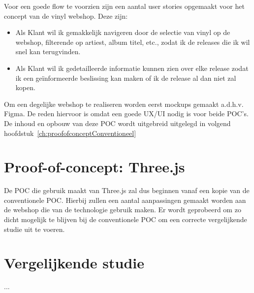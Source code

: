 Voor een goede flow te voorzien zijn een aantal user stories opgemaakt voor het concept van de vinyl webshop. Deze zijn:

\begin{itemize}
	\item Als Klant wil ik gemakkelijk navigeren door de selectie van vinyl op de webshop, filterende op artiest, album titel, etc., zodat ik de releases die ik wil snel kan terugvinden.
	\item Als Klant wil ik gedetailleerde informatie kunnen zien over elke release zodat ik een geïnformeerde beslissing kan maken of ik de release al dan niet zal kopen.
\end{itemize}

Om een degelijke webshop te realiseren worden eerst mockups gemaakt a.d.h.v. Figma. De reden hiervoor is omdat een goede UX/UI nodig is voor beide POC's. De inhoud en opbouw van deze POC wordt uitgebreid uitgelegd in volgend hoofdstuk~\ref{ch:proofofconceptConventioneel}

\section{Proof-of-concept: Three.js}

De POC die gebruik maakt van Three.js zal dus beginnen vanaf een kopie van de conventionele POC. Hierbij zullen een aantal aanpassingen gemaakt worden aan de webshop die van de technologie gebruik maken. Er wordt geprobeerd om zo dicht mogelijk te blijven bij de conventionele POC om een correcte vergelijkende studie uit te voeren.

\section{Vergelijkende studie}

...
